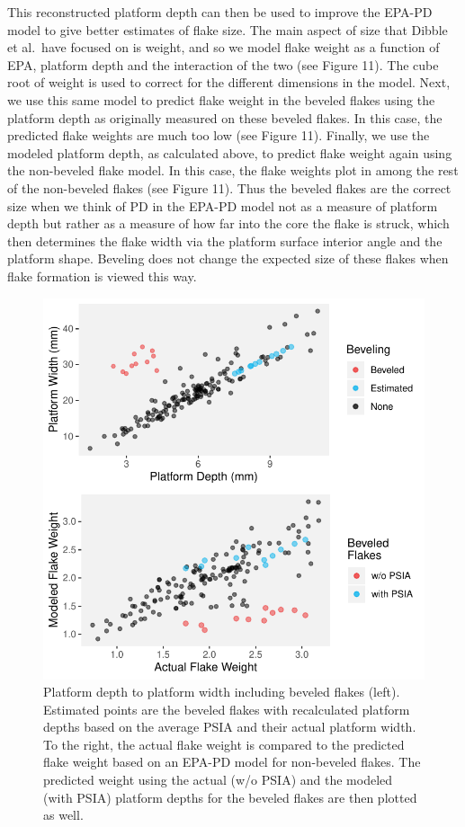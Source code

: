\documentclass[10pt,letterpaper]{article}
\begin{document}
This reconstructed platform depth can then be used to improve the EPA-PD
model to give better estimates of flake size. The main aspect of size
that Dibble et al.~have focused on is weight, and so we model flake
weight as a function of EPA, platform depth and the interaction of the
two (see Figure 11). The cube root of weight is used to correct for the
different dimensions in the model. Next, we use this same model to
predict flake weight in the beveled flakes using the platform depth as
originally measured on these beveled flakes. In this case, the predicted
flake weights are much too low (see Figure 11). Finally, we use the
modeled platform depth, as calculated above, to predict flake weight
again using the non-beveled flake model. In this case, the flake weights
plot in among the rest of the non-beveled flakes (see Figure 11). Thus
the beveled flakes are the correct size when we think of PD in the
EPA-PD model not as a measure of platform depth but rather as a measure
of how far into the core the flake is struck, which then determines the
flake width via the platform surface interior angle and the platform
shape. Beveling does not change the expected size of these flakes when
flake formation is viewed this way.

\begin{figure}
\centering
\includegraphics{PSIA_Manuscript_files/figure-latex/fig11-bevel_with_estimated_pd-1.pdf}
\caption{Platform depth to platform width including beveled flakes
(left). Estimated points are the beveled flakes with recalculated
platform depths based on the average PSIA and their actual platform
width. To the right, the actual flake weight is compared to the
predicted flake weight based on an EPA-PD model for non-beveled flakes.
The predicted weight using the actual (w/o PSIA) and the modeled (with
PSIA) platform depths for the beveled flakes are then plotted as well.}
\end{figure}
\end{document}
